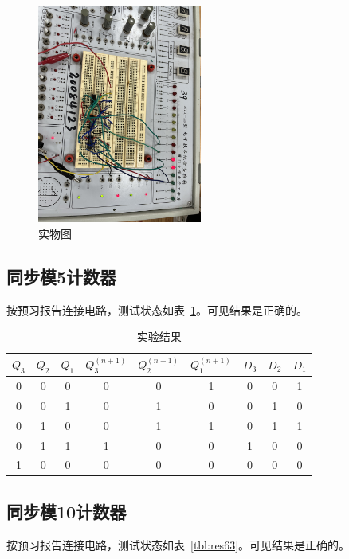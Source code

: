 \documentclass[a4paper,twoside]{ctexart}
\begin{document}
\begin{spacing}{1.2}
\begin{figure}[htbp]
	\centering
	\caption{实物图}
	\label{fig:res61}
	\includegraphics[width=0.48\textwidth,angle=90]{61.jpg}
\end{figure}

\subsection{同步模5计数器}

按预习报告连接电路，测试状态如表~\ref{tbl:res62}。可见结果是正确的。

\begin{table}[htbp]
	\centering
	\caption{实验结果}
	\label{tbl:res62}
	\begin{tabular}{ccc|ccc|ccc}
		\toprule
		\hline
		$Q_3$&$Q_2$&$Q_1$&$Q_3^{(n+1)}$&$Q_2^{(n+1)}$&$Q_1^{(n+1)}$&$D_3$&$D_2$&$D_1$ \\
		\hline
		0&0&0&0&0&1&0&0&1 \\
		0&0&1&0&1&0&0&1&0 \\
		0&1&0&0&1&1&0&1&1 \\
		0&1&1&1&0&0&1&0&0 \\
		1&0&0&0&0&0&0&0&0 \\
		\hline
		\bottomrule
	\end{tabular}
\end{table}

\clearpage

\subsection{同步模10计数器}
按预习报告连接电路，测试状态如表~\ref{tbl:res63}。可见结果是正确的。


\end{spacing}
\end{document}
